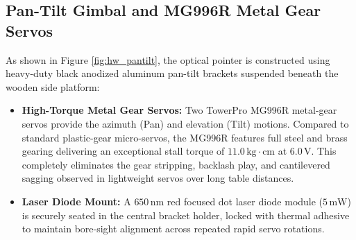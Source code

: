 \subsection{Pan-Tilt Gimbal and MG996R Metal Gear Servos}
As shown in Figure \ref{fig:hw_pantilt}, the optical pointer is constructed using heavy-duty black anodized aluminum pan-tilt brackets suspended beneath the wooden side platform:
\begin{itemize}
    \item \textbf{High-Torque Metal Gear Servos:} Two TowerPro MG996R metal-gear servos provide the azimuth (Pan) and elevation (Tilt) motions. Compared to standard plastic-gear micro-servos, the MG996R features full steel and brass gearing delivering an exceptional stall torque of $11.0\,\text{kg}\cdot\text{cm}$ at $6.0\,\text{V}$. This completely eliminates the gear stripping, backlash play, and cantilevered sagging observed in lightweight servos over long table distances.
    \item \textbf{Laser Diode Mount:} A $650\,\text{nm}$ red focused dot laser diode module ($5\,\text{mW}$) is securely seated in the central bracket holder, locked with thermal adhesive to maintain bore-sight alignment across repeated rapid servo rotations.
\end{itemize}

